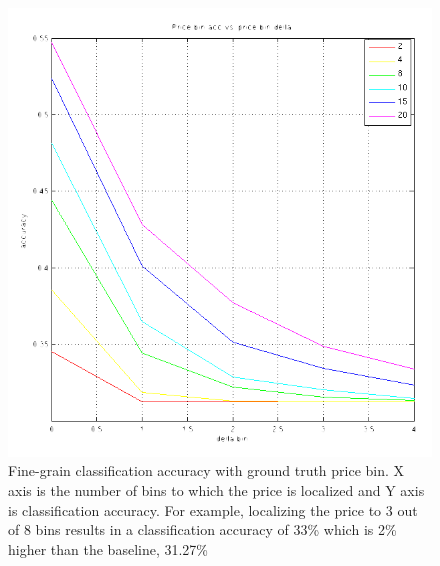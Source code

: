 \documentclass[10pt,twocolumn,letterpaper]{article}
\begin{document}
\begin{figure}[t]
\begin{center}
\includegraphics[width=0.9\linewidth]{img/price-att.png}
\end{center}
   \caption{Fine-grain classification accuracy with ground truth price bin. X axis is the number of bins to which the price is localized and Y axis is classification accuracy. For example, localizing the price to 3 out of 8 bins results in a classification accuracy of 33\% which is 2\% higher than the baseline, 31.27\%}
\label{fig:price-acc}
\end{figure}
\end{document}

